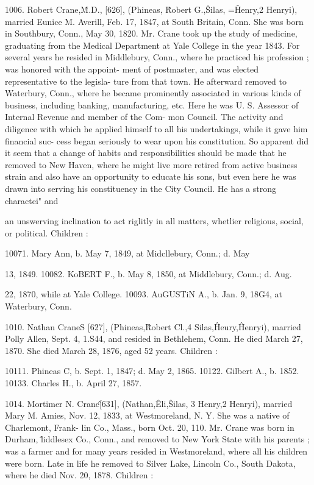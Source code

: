 1006. Robert Crane,\^ M.D., [626], (Phineas, \^ Robert G.,\^ 
Silas, =\^ Henry,2 Henryi), married Eunice M. Averill, Feb. 17, 
1847, at South Britain, Conn. She was born in Southbury, 
Conn., May 30, 1820. Mr. Crane took up the study of medicine, 
graduating from the Medical Department at Yale College in the 
year 1843. For several years he resided in Middlebury, Conn., 
where he practiced his profession ; was honored with the appoint- 
ment of postmaster, and was elected representative to the legisla- 
ture from that town. He afterward removed to Waterbury, 
Conn., where he became prominently associated in various kinds 
of business, including banking, manufacturing, etc. Here he 
was U. S. Assessor of Internal Revenue and member of the Com- 
mon Council. The activity and diligence with which he applied 
himself to all his undertakings, while it gave him financial suc- 
cess began seriously to wear upon his constitution. So apparent 
did it seem that a change of habits and responsibilities should be 
made that he removed to New Haven, where he might live more 
retired from active business strain and also have an opportunity 
to educate his sons, but even here he was drawn into serving his 
constituency in the City Council. He has a strong charactei" and 




an unswerving inclination to act riglitly in all matters, whetlier 
religious, social, or political. Children : 

10071. Mary Ann, b. May 7, 1849, at Midcllebury, Conn.; d. May 

13, 1849. 
10082. KoBERT F., b. May 8, 1850, at Middlebury, Conn.; d. Aug. 

22, 1870, while at Yale College. 
10093. AuGUSTiN A., b. Jan. 9, 18G4, at Waterbury, Conn. 

1010. Nathan CraneS [627], (Phineas,\^ Robert Cl.,4 Silas,\^ 
Heury,\^ Henryi), married Polly Allen, Sept. 4, 1.S44, and resided 
in Bethlehem, Conn. He died March 27, 1870. She died March 
28, 1876, aged 52 years. Children : 

10111. Phineas C, b. Sept. 1, 1847; d. May 2, 1865. 
10122. Gilbert A., b. 1852. 
10133. Charles H., b. April 27, 1857. 

1014. Mortimer N. Crane\^ [631], (Nathan,\^ Eli,\^ Silas, 3 
Henry,2 Henryi), married Mary M. Amies, Nov. 12, 1833, at 
Westmoreland, N. Y. She was a native of Charlemont, Frank- 
lin Co., Mass., born Oct. 20, 110. Mr. Crane was born in 
Durham, \^liddlesex Co., Conn., and removed to New York State 
with his parents ; was a farmer and for many years resided in 
Westmoreland, where all his children were born. Late in life he 
removed to Silver Lake, Lincoln Co., South Dakota, where he 
died Nov. 20, 1878. Children : 

